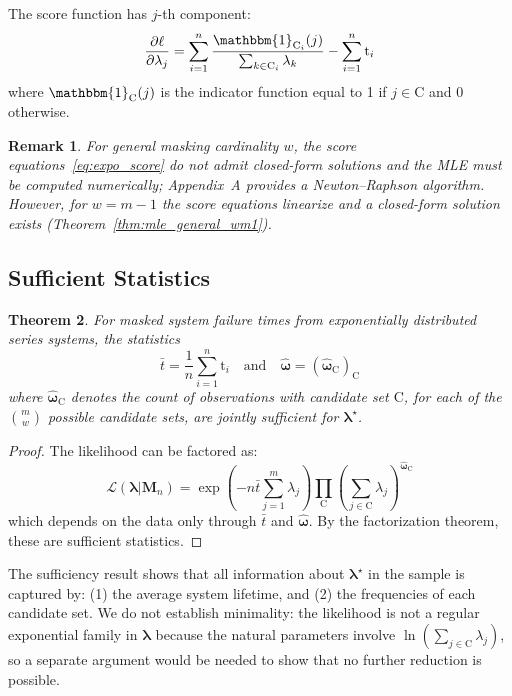 \documentclass[pdflatex,sn-mathphys-num,Numbered]{sn-jnl}
\newcommand{\RV}[1]{\mathrm{#1}}
\newcommand{\cand}{\RV{C}}         %
\newcommand{\ti}{\mathrm{t}}       %
\newcommand{\tparam}[1]{{#1}^{\star}}  %
\newcommand{\likelihood}{\mathcal{L}}
\newcommand{\mfs}{\mathbf{M}_n}
\newcommand{\cntsymb}{\boldsymbol{\hat\omega}}
\renewcommand{\vec}[1]{\boldsymbol{#1}}
\newcommand{\SetIndicator}[1]{\mathbbm{1}_{#1}}
\theoremstyle{thmstyleone}
\newtheorem{theorem}{Theorem}[section]
\theoremstyle{thmstylethree}
\theoremstyle{thmstyletwo}
\newtheorem{remark}[theorem]{Remark}
\begin{document}
The score function has $j$-th component:
\begin{equation}
\label{eq:expo_score}
\frac{\partial \ell}{\partial \lambda_j} = \sum_{i=1}^{n} \frac{\SetIndicator{\cand_i}(j)}{\sum_{k \in \cand_i} \lambda_k} - \sum_{i=1}^{n} \ti_i
\end{equation}
where $\SetIndicator{\cand}(j)$ is the indicator function equal to 1 if $j \in \cand$ and 0 otherwise.

\begin{remark}
For general masking cardinality $w$, the score equations~\eqref{eq:expo_score} do not admit closed-form solutions and the MLE must be computed numerically; Appendix~A provides a Newton--Raphson algorithm. However, for $w = m-1$ the score equations linearize and a closed-form solution exists (Theorem~\ref{thm:mle_general_wm1}).
\end{remark}

\subsection{Sufficient Statistics}

\begin{theorem}
\label{thm:sufficient_stats}
For masked system failure times from exponentially distributed series systems, the statistics
\begin{equation}
\bar{t} = \frac{1}{n} \sum_{i=1}^{n} \ti_i \quad \text{and} \quad \cntsymb = (\cntsymb_{\cand})_{\cand}
\end{equation}
where $\cntsymb_{\cand}$ denotes the count of observations with candidate set $\cand$, for each of the $\binom{m}{w}$ possible candidate sets, are jointly sufficient for $\tparam{\vec{\lambda}}$.
\end{theorem}

\begin{proof}
The likelihood can be factored as:
\begin{equation}
\likelihood(\vec{\lambda} | \mfs) = \exp\left(-n \bar{t} \sum_{j=1}^{m} \lambda_j\right) \prod_{\cand} \left(\sum_{j \in \cand} \lambda_j\right)^{\cntsymb_{\cand}}
\end{equation}
which depends on the data only through $\bar{t}$ and $\cntsymb$. By the factorization theorem, these are sufficient statistics.
\end{proof}

The sufficiency result shows that all information about $\tparam{\vec{\lambda}}$ in the sample is captured by: (1) the average system lifetime, and (2) the frequencies of each candidate set.
We do not establish minimality: the likelihood is not a regular exponential family in $\vec{\lambda}$ because the natural parameters involve $\ln(\sum_{j \in \cand} \lambda_j)$, so a separate argument would be needed to show that no further reduction is possible.
\end{document}
